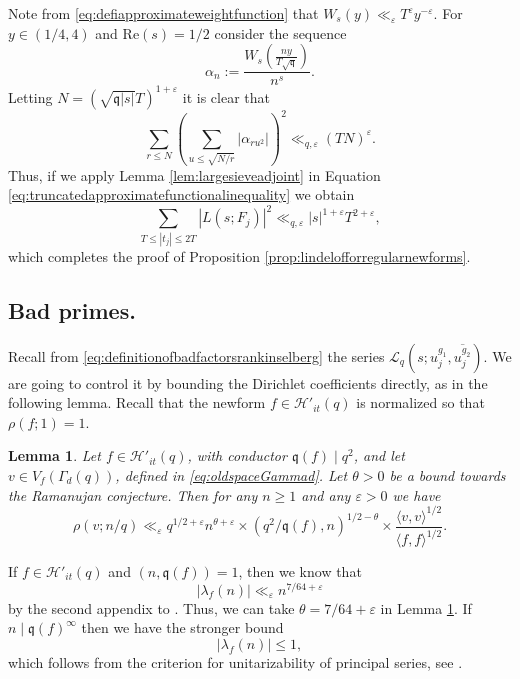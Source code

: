 \documentclass{article}
\newtheorem{lem}[thm]{Lemma}
\theoremstyle{named}
\newcommand{\HH}{\mathcal{H}}
\renewcommand{\L}{\mathcal{L}}
\newcommand{\q}{\mathfrak{q}}
\begin{document}
Note from \eqref{eq:defiapproximateweightfunction} that $W_s(y) \ll_\varepsilon T^\varepsilon y^{-\varepsilon}$. For $y \in (1/4, 4)$ and $\text{Re}(s) = 1/2$ consider the sequence
\begin{equation*}
    \alpha_n := \frac{W_s\left(\frac{ny}{T \sqrt{\q}}\right)}{n^s}.
\end{equation*}
Letting $N = (\sqrt{\q|s|}T)^{1 + \varepsilon}$ it is clear that  
\begin{equation*}
    \sum_{r \leq N}\left(\sum_{u \leq \sqrt{N/r}}|\alpha_{ru^2}|\right)^2 \ll_{q, \varepsilon} (TN)^\varepsilon. 
\end{equation*}
Thus, if we apply Lemma \ref{lem:largesieveadjoint} in Equation \eqref{eq:truncatedapproximatefunctionalinequality} we obtain 
\begin{equation*}
    \sum_{T \leq |t_j| \leq 2T}  |L(s; F_j)|^2 \ll_{q, \varepsilon} |s|^{1 + \varepsilon} T^{2 + \varepsilon},
\end{equation*}
which completes the proof of Proposition \ref{prop:lindelofforregularnewforms}.



\subsection{Bad primes.}\label{subsec:badprimes}
Recall from \eqref{eq:definitionofbadfactorsrankinselberg} the series $\L_q(s; u_j^{g_1},  \overline{u_j^{g_2}})$. We are going to control it by bounding the Dirichlet coefficients directly, as in the following lemma. Recall that the newform $f \in \HH'_{it}(q)$ is normalized so that $\rho(f; 1) = 1$.
\begin{lem}\label{lem:boundfouriercoefficientoldspace}
Let $f \in \HH'_{it}(q)$, with conductor $\q(f) \mid q^2$, and let $v \in V_f(\Gamma_d(q))$, defined in \eqref{eq:oldspaceGammad}. Let $\theta > 0$ be a bound towards the Ramanujan conjecture. Then for any $n \geq 1$ and any $\varepsilon > 0$ we have
\begin{equation*}
    \rho(v; n/q) \ll_{\varepsilon} q^{1/2 + \varepsilon} n^{\theta + \varepsilon} \times  (q^2/\q(f), n)^{1/2 - \theta} \times \frac{\langle v, v\rangle^{1/2}}{\langle f, f \rangle^{1/2}}.
\end{equation*}
\end{lem}
 If $f \in \HH'_{it}(q)$ and $(n, \q(f)) = 1$, then we know that 
\begin{equation}\label{eq:heckeeigenvalueboundgoodprimes}
    |\lambda_f(n)| \ll_{\varepsilon} n^{7/64 + \varepsilon}
\end{equation}
by the second appendix to \cite{kimramakrishnansarnak2003}. Thus, we can take $\theta = 7/64 + \varepsilon$ in Lemma \ref{lem:boundfouriercoefficientoldspace}. If $n \mid \q(f)^\infty$ then we have the stronger bound 
\begin{equation}\label{eq:heckeeigenvalueboundbadprimes}
    |\lambda_f(n)| \leq 1,
\end{equation} 
which follows from the criterion for unitarizability of principal series, see \cite[Proposition 4.6.12]{bump}.
\end{document}
